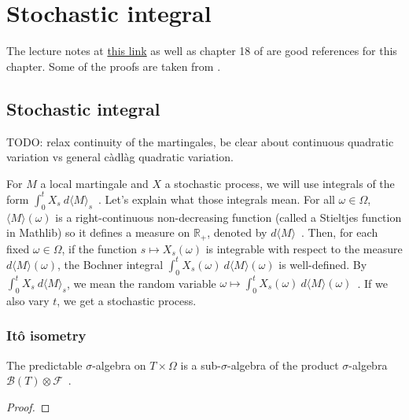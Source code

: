 \chapter{Stochastic integral}

The lecture notes at \href{https://dec41.user.srcf.net/h/III_L/stochastic_calculus_and_applications/}{this link} as well as chapter 18 of \cite{kallenberg2021} are good references for this chapter.
Some of the proofs are taken from \cite{pascucci2024}.





\section{Stochastic integral}

TODO: relax continuity of the martingales, be clear about continuous quadratic variation vs general càdlàg quadratic variation.

For $M$ a local martingale and $X$ a stochastic process, we will use integrals of the form $\int_0^t X_s \: d\langle M \rangle_s$~.
Let's explain what those integrals mean. For all $\omega \in \Omega$, $\langle M \rangle(\omega)$ is a right-continuous non-decreasing function (called a Stieltjes function in Mathlib) so it defines a measure on $\mathbb{R}_+$, denoted by $d\langle M \rangle$~.
Then, for each fixed $\omega \in \Omega$, if the function $s \mapsto X_s(\omega)$ is integrable with respect to the measure $d\langle M \rangle(\omega)$, the Bochner integral $\int_0^t X_s(\omega) \: d\langle M \rangle(\omega)$ is well-defined.
By $\int_0^t X_s \: d\langle M \rangle_s$, we mean the random variable $\omega \mapsto \int_0^t X_s(\omega) \: d\langle M \rangle(\omega)$~.
If we also vary $t$, we get a stochastic process.



\subsection{Itô isometry}


\begin{lemma}\label{lem:Filtration.predictable_le_prod}
  \leanok
The predictable $\sigma$-algebra on $T \times \Omega$ is a sub-$\sigma$-algebra of the product $\sigma$-algebra $\mathcal{B}(T) \otimes \mathcal{F}$~.
\end{lemma}

\begin{proof}\leanok

\end{proof}


